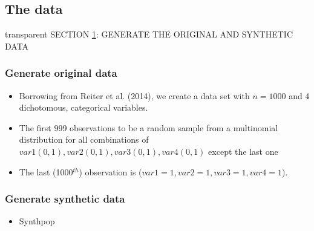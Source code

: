 \documentclass[t,8pt,utfx8]{beamer}
\begin{document}
\begin{spacing}{1.25}
\section{The data}\label{sec:data}

\begin{frame}[c,plain]
\vskip-4mm
\begin{beamercolorbox}[wd=\boxwidth,ht=22.11mm]{transparent}%
    \vfill%
    \leftinsert%
    \MakeUppercase{Section \ref{sec:data}: Generate the original and synthetic data
} %
\end{beamercolorbox}
\vskip-3mm
\end{frame}

\begin{frame}[t]\frametitle{Generate original data}
\begin{itemize}
    \item Borrowing from Reiter et al. (2014), we create a data set with $n=1000$ and 4 dichotomous, categorical variables. 
    \item The first 999 observations to be a random sample from a multinomial distribution for all combinations of $var1(0,1), var2(0,1), var3(0,1), var4(0,1)$ except the last one
    \item The last (1000$^{th}$) observation is ($var1=1,var2=1,var3=1,var4=1$). 
\end{itemize}
\end{frame}

\begin{frame}[t]\frametitle{Generate synthetic data}
\begin{itemize}
    \item Synthpop
\end{itemize}
\end{frame}


\end{spacing}
\end{document}
